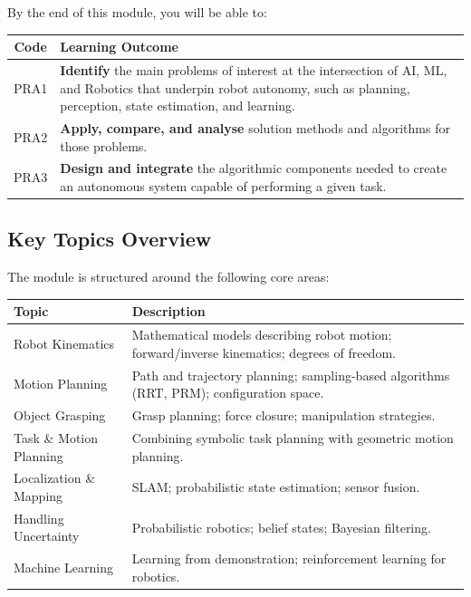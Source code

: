 By the end of this module, you will be able to:

\begin{center}
\renewcommand{\arraystretch}{1.4}
\begin{tabular}{@{} c p{12cm} @{}}
\toprule
\textbf{Code} & \textbf{Learning Outcome} \\
\midrule
PRA1 & \textbf{Identify} the main problems of interest at the intersection of AI, ML, and Robotics that underpin robot autonomy, such as planning, perception, state estimation, and learning. \\
PRA2 & \textbf{Apply, compare, and analyse} solution methods and algorithms for those problems. \\
PRA3 & \textbf{Design and integrate} the algorithmic components needed to create an autonomous system capable of performing a given task. \\
\bottomrule
\end{tabular}
\end{center}

\bigseparator

\subsection*{Key Topics Overview}

The module is structured around the following core areas:

\begin{center}
\renewcommand{\arraystretch}{1.3}
\begin{tabular}{@{} l p{10cm} @{}}
\toprule
\textbf{Topic} & \textbf{Description} \\
\midrule
Robot Kinematics & Mathematical models describing robot motion; forward/inverse kinematics; degrees of freedom. \\
Motion Planning & Path and trajectory planning; sampling-based algorithms (RRT, PRM); configuration space. \\
Object Grasping & Grasp planning; force closure; manipulation strategies. \\
Task \& Motion Planning & Combining symbolic task planning with geometric motion planning. \\
Localization \& Mapping & SLAM; probabilistic state estimation; sensor fusion. \\
Handling Uncertainty & Probabilistic robotics; belief states; Bayesian filtering. \\
Machine Learning & Learning from demonstration; reinforcement learning for robotics. \\
\bottomrule
\end{tabular}
\end{center}

